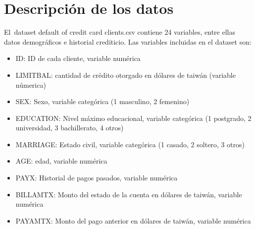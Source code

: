 \documentclass[12pt]{report}
\renewcommand{\_}{\kern-1.5pt\textunderscore\kern-1.5pt}
\begin{document}
\vspace{\baselineskip}

\vspace{\baselineskip}

\vspace{\baselineskip}

\vspace{\baselineskip}

\vspace{\baselineskip}
\section{Descripción de los datos}

\vspace{\baselineskip}
El\ dataset  default of credit card clients.csv contiene 24 variables, entre ellas datos demográficos e historial crediticio.
Las variables incluidas en el dataset son:

\vspace{\baselineskip}
\begin{itemize}
	\item ID: ID de cada cliente, variable numérica
	\item LIMIT\_BAL: cantidad de crédito otorgado en dólares de taiwán (variable númerica)
	\item SEX: Sexo, variable categórica (1 masculino, 2 femenino)
	\item EDUCATION: Nivel máximo educacional, variable categórica (1 postgrado, 2 universidad, 3 bachillerato, 4 otros)
	\item MARRIAGE: Estado civil, variable categórica (1 casado, 2 soltero, 3 otros)
	\item AGE: edad, variable numérica
	\item PAY\_X: Historial de pagos pasados, variable numérica
	\item BILL\_AMTX: Monto del estado de la cuenta en dólares de taiwán, variable numérica
	\item PAY\_AMTX: Monto del pago anterior en dólares de taiwán, variable numérica
\end{itemize}

\vspace{\baselineskip}

\vspace{\baselineskip}

\vspace{\baselineskip}

\vspace{\baselineskip}
\end{document}
